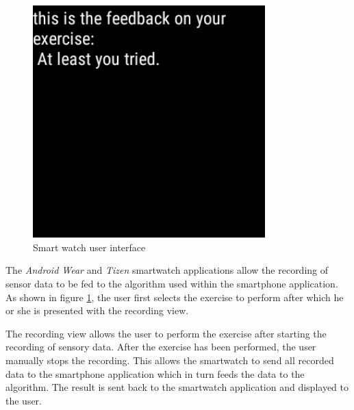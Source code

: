 \begin{figure}[b!]
\begin{minipage}{0.20\textwidth}
    \end{minipage}
    \begin{minipage}{0.20\textwidth}
      \centering
        \includegraphics[width=0.80\textwidth]{00_resources/figures/Android_Watch_FeedbackView.png}
    \end{minipage}
  \caption{Smart watch user interface}
  \label{fig:smwui}
\end{figure}

The \textit{Android Wear} and \textit{Tizen} smartwatch applications allow the
recording of sensor data to be fed to the algorithm used within the
smartphone application. As shown in figure \ref{fig:smwui}, the user first
selects the exercise to perform after which he or she is presented with the
recording view.

The recording view allows the user to perform the exercise after starting the
recording of sensory data. After the exercise has been performed, the user
manually stops the recording. This allows the smartwatch to send all recorded
data to the smartphone application which in turn feeds the data to the
algorithm. The result is sent back to the smartwatch application and displayed
to the user.
